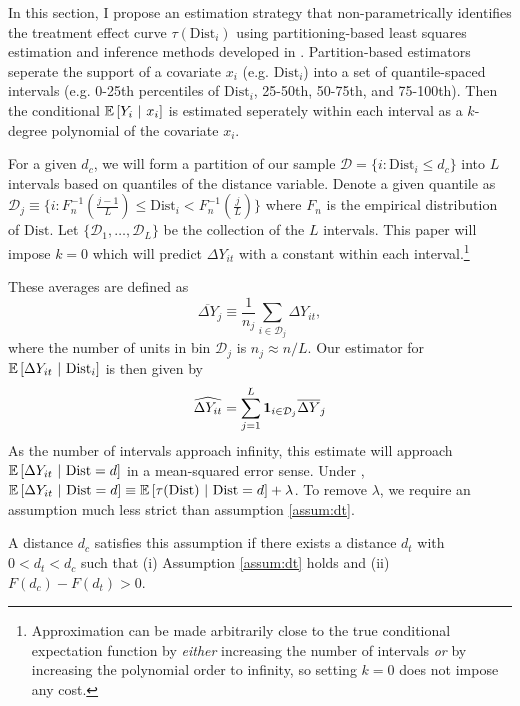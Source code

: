\documentclass[10pt]{article}
\newcommand{\dist}{\text{Dist}}
\begin{document}
In this section, I propose an estimation strategy that non-parametrically identifies the treatment effect curve $\tau(\dist_i)$ using partitioning-based least squares estimation and inference methods developed in \citet{Cattaneo_Crump_Farrell_Feng_2019, Cattaneo_Farrell_Feng_2019}. Partition-based estimators seperate the support of a covariate $x_i$ (e.g. $\dist_i$) into a set of quantile-spaced intervals (e.g. 0-25th percentiles of $\dist_i$, 25-50th, 50-75th, and 75-100th). Then the conditional $\mathbb{E}\left[Y_i \ \vert \ x_i\right]$ is estimated seperately within each interval as a $k$-degree polynomial of the covariate $x_i$.

For a given $d_c$, we will form a partition of our sample $\mathcal{D} = \{ i : \dist_i \leq d_c \}$ into $L$ intervals based on quantiles of the distance variable. Denote a given quantile as $\mathcal{D}_j \equiv\{ i : F_n^{-1}(\frac{j-1}{L}) \leq \dist_i < F_n^{-1}(\frac{j}{L}) \}$ where $F_n$ is the empirical distribution of $\dist$. Let $\{ \mathcal{D}_1, \dots, \mathcal{D}_L \}$ be the collection of the $L$ intervals. This paper will impose $k = 0$ which will predict $\Delta Y_{it}$ with a constant within each interval.\footnote{Approximation can be made arbitrarily close to the true conditional expectation function by \emph{either} increasing the number of intervals \emph{or} by increasing the polynomial order to infinity, so setting $k = 0$ does not impose any cost.} 

These averages are defined as 
\[
    \overline{\Delta Y}_j \equiv \frac{1}{n_j} \sum_{i \in \mathcal{D}_j} \Delta Y_{it},
\]
where the number of units in bin $\mathcal{D}_j$ is $n_j \approx n/L$. Our estimator for $\condexpec{\Delta Y_{it}}{\dist_i}$ is then given by
\[
    \widehat{\Delta Y_{it}} = \sum_{j = 1}^{L} \mathbf{1}_{i \in \mathcal{D}_j} \overline{\Delta Y}_j
\]
As the number of intervals approach infinity, this estimate will approach $\condexpec{\Delta Y_{it}}{\dist = d}$ in a mean-squared error sense. Under , $\condexpec{\Delta Y_{it}}{\dist = d} \equiv \condexpec{\tau(\dist)}{\dist = d} + \lambda$. To remove $\lambda$, we require an assumption much less strict than assumption \ref{assum:dt}.

\begin{assumption}[$d_t$ is within $d_c$]\label{assum:dt_weak}
    A distance $d_c$ satisfies this assumption if there exists a distance $d_t$ with $0 < d_t < d_c$ such that (i) Assumption \ref{assum:dt} holds and (ii) $F(d_c) - F(d_t) > 0$.
\end{assumption}
\end{document}
